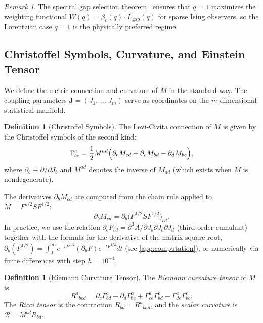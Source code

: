 \documentclass[11pt]{article}
\theoremstyle{definition}
\newtheorem{definition}[theorem]{Definition}
\theoremstyle{remark}
\newtheorem{remark}[theorem]{Remark}
\newcommand{\Fish}{F}
\newcommand{\sgn}{S}
\newcommand{\Met}{M}
\newcommand{\coupl}{\mathbf{J}}
\newcommand{\Chr}[2]{\Gamma^{#1}_{#2}}
\newcommand{\Ric}{R}
\newcommand{\Scal}{\mathcal{R}}
\begin{document}
\begin{remark}
The spectral gap selection theorem~\cite{Paper5} ensures that $q = 1$
maximizes the weighting functional $W(q) = \beta_c(q) \cdot L_{\mathrm{gap}}(q)$
for sparse Ising observers, so the Lorentzian case $q = 1$ is the
physically preferred regime.
\end{remark}

\subsection{Christoffel Symbols, Curvature, and Einstein Tensor}

We define the metric connection and curvature of $\Met$ in the standard
way. The coupling parameters $\coupl = (J_1, \ldots, J_m)$ serve as
coordinates on the $m$-dimensional statistical manifold.

\begin{definition}[Christoffel Symbols]
\label{def:christoffel}
The Levi-Civita connection of $\Met$ is given by the Christoffel symbols
of the second kind:
\begin{equation}
  \Chr{a}{bc} = \frac{1}{2} \Met^{ad}
    \Bigl(\partial_b \Met_{cd} + \partial_c \Met_{bd} - \partial_d \Met_{bc}\Bigr),
  \label{eq:christoffel}
\end{equation}
where $\partial_b \equiv \partial/\partial J_b$ and $\Met^{ad}$ denotes
the inverse of $\Met_{ad}$ (which exists when $\Met$ is nondegenerate).
\end{definition}

The derivatives $\partial_b \Met_{cd}$ are computed from the chain rule
applied to $\Met = \Fish^{1/2}\sgn\Fish^{1/2}$:
\begin{equation}
  \partial_b \Met_{cd}
  = \partial_b\bigl(\Fish^{1/2}\sgn\Fish^{1/2}\bigr)_{cd}.
  \label{eq:metric-derivative}
\end{equation}
In practice, we use the relation $\partial_b \Fish_{cd} = \partial^3 A /
\partial J_b \partial J_c \partial J_d$ (third-order cumulant) together
with the formula for the derivative of the matrix square root,
$\partial_b(\Fish^{1/2}) = \int_0^\infty e^{-t\Fish^{1/2}} (\partial_b \Fish)
e^{-t\Fish^{1/2}} dt$ (see \cref{app:computation}), or numerically
via finite differences with step $h = 10^{-4}$.

\begin{definition}[Riemann Curvature Tensor]
\label{def:riemann}
The \emph{Riemann curvature tensor} of $\Met$ is
\begin{equation}
  \Ric^a{}_{bcd} = \partial_c \Chr{a}{bd} - \partial_d \Chr{a}{bc}
    + \Chr{a}{ce} \Chr{e}{bd} - \Chr{a}{de} \Chr{e}{bc}.
  \label{eq:riemann}
\end{equation}
The \emph{Ricci tensor} is the contraction $\Ric_{bd} = \Ric^a{}_{bad}$,
and the \emph{scalar curvature} is $\Scal = \Met^{bd} \Ric_{bd}$.
\end{definition}
\end{document}

